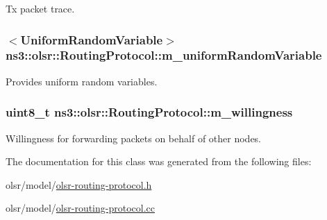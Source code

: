 Tx packet trace. 

\subsubsection[{\texorpdfstring{m\+\_\+uniform\+Random\+Variable}{m_uniformRandomVariable}}]{$<${\bf Uniform\+Random\+Variable}$>$ ns3\+::olsr\+::\+Routing\+Protocol\+::m\+\_\+uniform\+Random\+Variable\hspace{0.3cm}{\ttfamily [private]}}\hypertarget{classns3_1_1olsr_1_1RoutingProtocol_a5aacf6e47c25a9cedfb2998d09e05193}{}\label{classns3_1_1olsr_1_1RoutingProtocol_a5aacf6e47c25a9cedfb2998d09e05193}


Provides uniform random variables. 

\subsubsection[{\texorpdfstring{m\+\_\+willingness}{m_willingness}}]{\setlength{\rightskip}{0pt plus 5cm}uint8\+\_\+t ns3\+::olsr\+::\+Routing\+Protocol\+::m\+\_\+willingness\hspace{0.3cm}{\ttfamily [private]}}\hypertarget{classns3_1_1olsr_1_1RoutingProtocol_a2e94c2954ffa92d1c7d3b627087c9430}{}\label{classns3_1_1olsr_1_1RoutingProtocol_a2e94c2954ffa92d1c7d3b627087c9430}


Willingness for forwarding packets on behalf of other nodes. 



The documentation for this class was generated from the following files\+:\begin{DoxyCompactItemize}
\item 
olsr/model/\hyperlink{olsr-routing-protocol_8h}{olsr-\/routing-\/protocol.\+h}\item 
olsr/model/\hyperlink{olsr-routing-protocol_8cc}{olsr-\/routing-\/protocol.\+cc}\end{DoxyCompactItemize}
